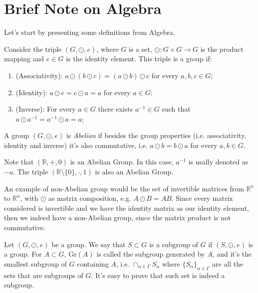 \section{Brief Note on Algebra}

Let's start by presenting some definitions from Algebra.

\begin{definition}[Groups]
	Consider the triple $(G, \odot, e)$, where $G$ is a set,
	$\odot : G \times G \to G$ is the product mapping and $e \in G$ is the identity element.
	This triple is a group if:
	\begin{enumerate}
		\item (Associativity): $a \odot (b \odot c) = (a \odot b) \odot c$ for every $a,b,c \in G$;
		\item (Identity): $a \odot e = e \odot a  = a$ for every $a \in G$;
		\item (Inverse): For every $a \in G$ there exists $a^{-1} \in G$ such that
		      $a\odot a^{-1} = a^{-1}\odot a = a$;
	\end{enumerate}
\end{definition}

\begin{definition}
	A group $(G, \odot, e)$ is \textit{Abelian} if besides the group properties (i.e. associativity, identity and inverse)
	it's also commutative, i.e. $a \odot b = b \odot a$ for every $a,b \in G$.
\end{definition}

\begin{example}
	Note that $(\mathbb R, +, 0)$ is an Abelian Group. In this case, $a^{-1}$ is usally denoted as $-a$.
	The triple $(\mathbb R \setminus \{0\}, \cdot, 1)$ is also an Abelian Group.

	An example of non-Abelian group would be the set of invertible matrices from $\mathbb R^n$ to $\mathbb R^n$,
	with $\odot$ as matrix composition, e.g. $A \odot B = A B$. Since every matrix considered is invertible
	and we have the identity matrix as our identity element, then we indeed have a non-Abelian group,
	since the matrix product is not commutative.
\end{example}

\begin{definition}
	Let $(G, \odot, e)$ be a group. We say that $S\subset G$ is a
	subgroup of $G$ if $(S, \odot, e)$ is a group.
	For $A \subset G$, $\text{Gr}(A)$ is called the subgroup generated by $A$,
	and it's the smallest subgroup of $G$ containing $A$, i.e.
	$\cap_{\alpha \in \Gamma} S_\alpha$ where $\{S_\alpha\}_{\alpha \in \Gamma}$ are
	all the sets that are subgroups of $G$.
	It's easy to prove that such set is indeed a subgroup.
\end{definition}

